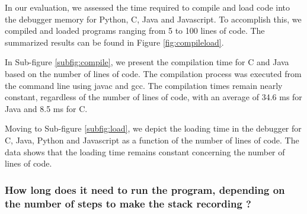 \documentclass[english,submission]{programming}
\begin{document}
In our evaluation, we assessed the time required to compile and load code into the debugger memory for Python, C, Java and Javascript. 
To accomplish this, we compiled and loaded programs ranging from 5 to 100 lines of code. 
The summarized results can be found in Figure \ref{fig:compileload}.

In Sub-figure \ref{subfig:compile}, we present the compilation time for C and Java based on the number of lines of code. 
The compilation process was executed from the command line using javac and gcc. 
The compilation times remain nearly constant, regardless of the number of lines of code, with an average of 34.6 ms for Java and 8.5 ms for C.

Moving to Sub-figure \ref{subfig:load}, we depict the loading time in the debugger for C, Java, Python and Javascript as a function of the number of lines of code. 
The data shows that the loading time remains constant concerning the number of lines of code. 

\subsubsection{How long does it need to run the program, depending on the number of steps to make the stack recording ?}
\end{document}
